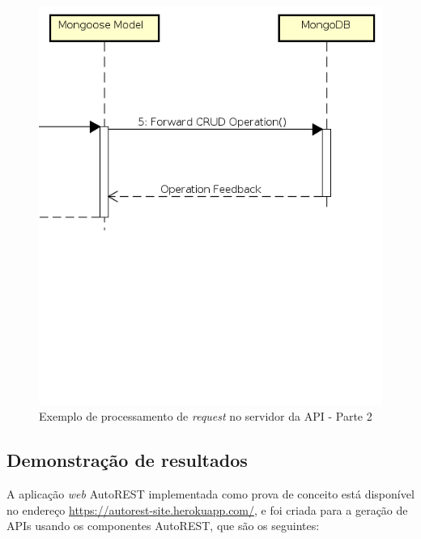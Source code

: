 \begin{figure}
    \begin{center}
        \includegraphics[scale=0.7]{imagens/API_Sequence_Diagram_2.png}
    \end{center}
	\caption{\label{fig:seq_api_2}Exemplo de processamento de \textit{request} no servidor da API - Parte 2}
\end{figure}


\subsection{Demonstração de resultados}
\label{sec:demo}

A aplicação \textit{web} AutoREST implementada como prova de conceito está disponível no endereço \url{https://autorest-site.herokuapp.com/}, e foi criada para a geração de APIs usando os componentes AutoREST, que são os seguintes:

